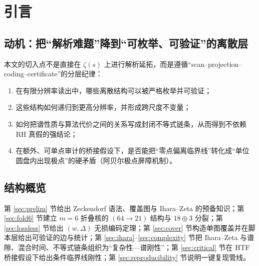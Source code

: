 \section{引言}

\subsection{动机：把“解析难题”降到“可枚举、可验证”的离散层}
本文的切入点不是直接在 $\zeta(s)$ 上进行解析延拓，而是遵循“scan--projection--coding--certificate”的分层纪律：
\begin{enumerate}
  \item 在有限分辨率读出中，哪些离散结构可以被严格枚举并可验证；
  \item 这些结构如何递归到更高分辨率，并形成跨尺度不变量；
  \item 如何把谱性质与算法代价之间的关系写成封闭不等式链条，从而得到不依赖 RH 真假的强结论；
  \item 在额外、可单点审计的桥接假设下，是否能把“零点偏离临界线”转化成“单位圆盘内出现极点”的硬矛盾（阿贝尔极点屏障机制）。
\end{enumerate}

\subsection{结构概览}
第 \ref{sec:prelim} 节给出 Zeckendorf 语法、覆盖图与 Ihara--Zeta 的预备知识；第 \ref{sec:fold6} 节建立 $m=6$ 折叠核的 $(64\to 21)$ 结构与 $18\oplus 3$ 分裂；第 \ref{sec:lossless} 节给出 $(w,\Delta)$ 无损编码定理；第 \ref{sec:cover} 节构造单图覆盖并在脚本层给出可验证的边与统计；第 \ref{sec:ihara}--\ref{sec:complexity} 节把 Ihara--Zeta 与谱隙、混合时间、不等式链条组织为“复杂性—谱刚性”；第 \ref{sec:critical} 节在 HTF 桥接假设下给出条件临界线刚性；第 \ref{sec:reproducibility} 节说明一键复现管线。

